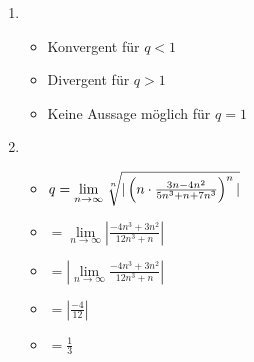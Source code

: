 \item
	\begin{enumerate}
	
	\item
		\begin{itemize}
			\item Konvergent für $q<1$
			\item Divergent für $q>1$
			\item Keine Aussage möglich für $q=1$
		\end{itemize}
	
	\item
		\begin{itemize}
			\item $q = \lim\limits_{n\to\infty} \nroot{n}{|\left(n \cdot \frac{3n-4n^2}{5n^3+n+7n^3}\right)^n|}$
			\item $ = \lim\limits_{n\to\infty} \left|\frac{-4n^3+3n^2}{12n^3+n}\right|$
			\item $ = \left| \lim\limits_{n\to\infty} \frac{-4n^3+3n^2}{12n^3+n}\right|$
			\item $ = \left| \frac{-4}{12} \right|$
			\item $ = \frac{1}{3}$
		\end{itemize}
		
	\end{enumerate}
